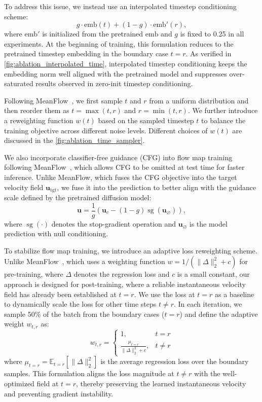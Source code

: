 To address this issue, we instead use an interpolated timestep conditioning scheme:
$$g \cdot \text{emb}(t) + (1-g) \cdot \text{emb}'(r),$$
where $\text{emb}'$ is initialized from the pretrained $\text{emb}$ and $g$ is fixed to 0.25 in all experiments. At the beginning of training, this formulation reduces to the pretrained timestep embedding in the boundary case $t=r$. As verified in \cref{fig:ablation_interpolated_time}, interpolated timestep conditioning keeps the embedding norm well aligned with the pretrained model and suppresses over-saturated results observed in zero-init timestep conditioning.

Following MeanFlow~\cite{geng2025mean}, we first sample $t$ and $r$ from a uniform distribution and then reorder them as $t=\max(t,r)$ and $r=\min(t,r)$. We further introduce a reweighting function $w(t)$ based on the sampled timestep $t$ to balance the training objective across different noise levels. Different choices of $w(t)$ are discussed in the \cref{fig:ablation_time_sampler}.


We also incorporate classifier-free guidance (CFG) into flow map training following MeanFlow~\cite{geng2025mean}, which allows CFG to be omitted at test time for faster inference. Unlike MeanFlow, which fuses the CFG objective into the target velocity field $\mathbf{u}_{\text{tgt}}$, we fuse it into the prediction to better align with the guidance scale defined by the pretrained diffusion model:
\begin{equation}
    \mathbf{u} = \frac{1}{g}\left(\mathbf{u}_c - (1-g)\operatorname{sg}(\mathbf{u}_{\varnothing})\right),
  \end{equation}
where $\operatorname{sg}(\cdot)$ denotes the stop-gradient operation and $\mathbf{u}_{\varnothing}$ is the model prediction with null conditioning.

 To stabilize flow map training, we introduce an adaptive loss reweighting scheme. Unlike MeanFlow~\cite{geng2025mean}, which uses a weighting function $w = 1 / (\|\Delta\|_2^2 + c)$ for pre-training, where $\Delta$ denotes the regression loss and $c$ is a small constant, our approach is designed for post-training, where a reliable instantaneous velocity field has already been established at $t=r$. We use the loss at $t=r$ as a baseline to dynamically scale the loss for other time steps $t \neq r$. In each iteration, we sample 50\% of the batch from the boundary cases ($t=r$) and define the adaptive weight $w_{t,r}$ as:
\begin{equation}
  w_{t,r} =
  \begin{cases} 1, & t = r \\ \displaystyle \frac{\mu_{t=r}}{\|\Delta\|_2^2 + c}, & t \neq r
  \end{cases}
\end{equation}
where $\mu_{t=r} = \mathbb{E}_{t=r} [ \|\Delta\|_2^2 ]$ is the average regression loss over the boundary samples. This formulation aligns the loss magnitude at $t \neq r$ with the well-optimized field at $t=r$, thereby preserving the learned instantaneous velocity and preventing gradient instability.


